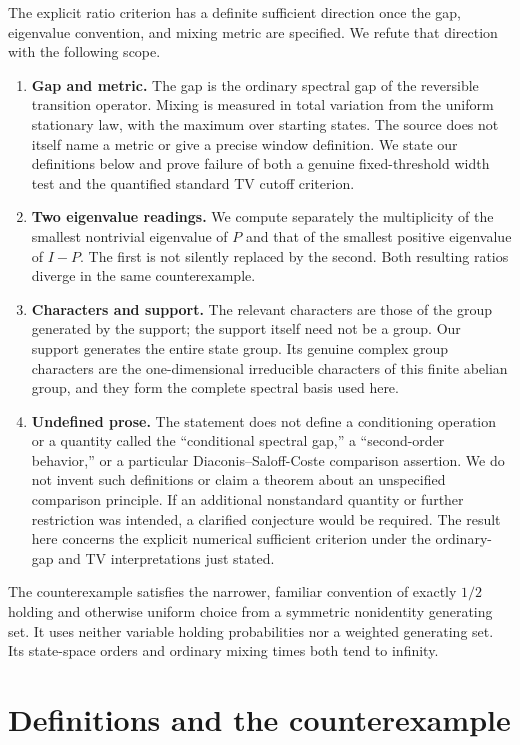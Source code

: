\documentclass[11pt,a4paper]{article}
\theoremstyle{definition}
\theoremstyle{remark}
\begin{document}
The explicit ratio criterion has a definite sufficient direction once the
gap, eigenvalue convention, and mixing metric are specified. We refute that
direction with the following scope.

\begin{enumerate}[label=\arabic*.]
\item \textbf{Gap and metric.} The gap is the ordinary spectral gap of the
reversible transition operator. Mixing is measured in total variation from
the uniform stationary law, with the maximum over starting states. The
source does not itself name a metric or give a precise window definition.
We state our definitions below and prove failure of both a genuine
fixed-threshold width test and the quantified standard TV cutoff criterion.
\item \textbf{Two eigenvalue readings.} We compute separately the
multiplicity of the smallest nontrivial eigenvalue of $P$ and that of the
smallest positive eigenvalue of $I-P$. The first is not silently replaced
by the second. Both resulting ratios diverge in the same counterexample.
\item \textbf{Characters and support.} The relevant characters are those
of the group generated by the support; the support itself need not be a
group. Our support generates the entire state group. Its genuine complex
group characters are the one-dimensional irreducible characters of this
finite abelian group, and they form the complete spectral basis used here.
\item \textbf{Undefined prose.} The statement does not define a
conditioning operation or a quantity called the ``conditional spectral
gap,'' a ``second-order behavior,'' or a particular Diaconis--Saloff-Coste
comparison assertion. We do not invent such definitions or claim a theorem
about an unspecified comparison principle. If an additional nonstandard
quantity or further restriction was intended, a clarified conjecture would
be required. The result here concerns the explicit numerical sufficient
criterion under the ordinary-gap and TV interpretations just stated.
\end{enumerate}

The counterexample satisfies the narrower, familiar convention of exactly
$1/2$ holding and otherwise uniform choice from a symmetric nonidentity
generating set. It uses neither variable holding probabilities nor a
weighted generating set. Its state-space orders and ordinary mixing times
both tend to infinity.

\section{Definitions and the counterexample}
\end{document}
